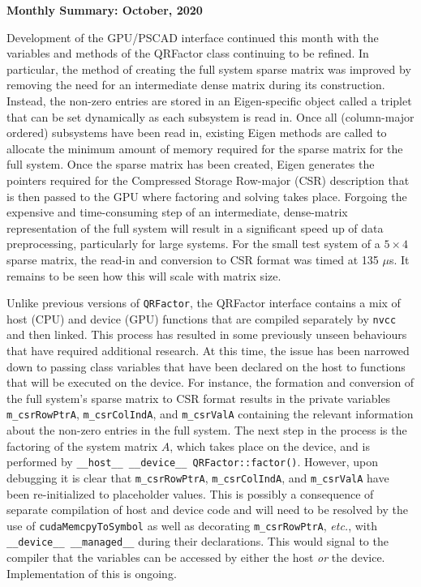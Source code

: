 \documentclass[11pt,letterpaper]{article}
\newcommand{\qrf}{\texttt{QRFactor}}
\begin{document}
\begin{center}
    {\Large \bf Monthly Summary: October, 2020}
\end{center}

\bigskip

Development of the GPU/PSCAD interface continued this month with the variables and methods of the QRFactor class continuing to be refined. In particular, the method of creating the full system sparse matrix was improved by removing the need for an intermediate dense matrix during its construction. Instead, the non-zero entries are stored in an Eigen-specific object called a triplet that can be set dynamically as each subsystem is read in. Once all (column-major ordered) subsystems have been read in, existing Eigen methods are called to allocate the minimum amount of memory required for the sparse matrix for the full system. Once the sparse matrix has been created, Eigen generates the pointers required for the Compressed Storage Row-major (CSR) description that is then passed to the GPU where factoring and solving takes place. Forgoing the expensive and time-consuming step of an intermediate, dense-matrix representation of the full system will result in a significant speed up of data preprocessing, particularly for large systems. For the small test system of a $5\times 4$ sparse matrix, the read-in and conversion to CSR format was timed at 135 $\mu$s. It remains to be seen how this will scale with matrix size.

Unlike previous versions of \qrf\!, the QRFactor interface contains a mix of host (CPU) and device (GPU) functions that are compiled separately by \verb+nvcc+ and then linked. This process has resulted in some previously unseen behaviours that have required additional research. At this time, the issue has been narrowed down to passing class variables that have been declared on the host to functions that will be executed on the device. For instance, the formation and conversion of the full system's sparse matrix to CSR format results in the private variables \verb+m_csrRowPtrA+, \verb+m_csrColIndA+, and \verb+m_csrValA+ containing the relevant information about the non-zero entries in the full system. The next step in the process is the factoring of the system matrix $A$, which takes place on the device, and is performed by \verb+__host__ __device__ QRFactor::factor()+. However, upon debugging it is clear that \verb+m_csrRowPtrA+, \verb+m_csrColIndA+, and \verb+m_csrValA+ have been re-initialized to placeholder values. This is possibly a consequence of separate compilation of host and device code and will need to be resolved by the use of \verb+cudaMemcpyToSymbol+ as well as decorating \verb+m_csrRowPtrA+, {\it etc.}, with \verb+__device__ __managed__+ during their declarations. This would signal to the compiler that the variables can be accessed by either the host \emph{or} the device. Implementation of this is ongoing.


\end{document}

